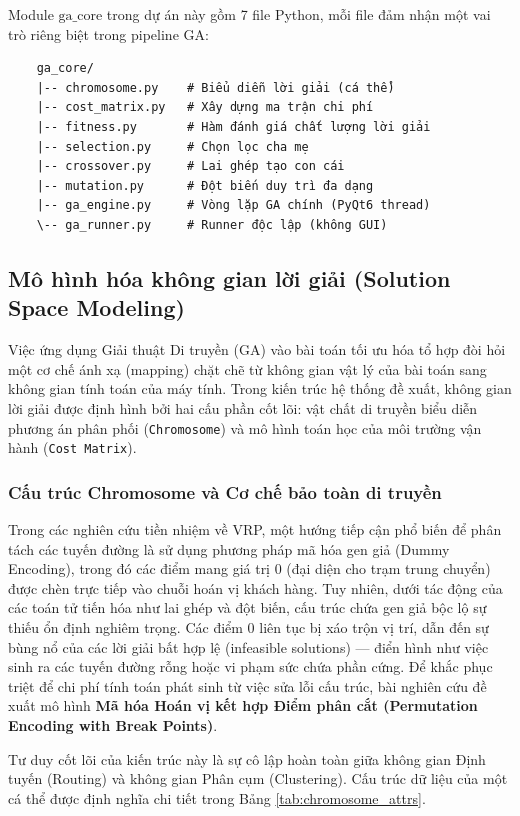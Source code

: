 \documentclass[12pt,a4paper]{article}
\numberwithin{figure}{subsection}
\begin{document}
Module \textbf{$\text{ga\_core}$} trong dự án này gồm 7 file Python, mỗi file đảm nhận một vai trò riêng biệt trong pipeline GA:
    \begin{verbatim}
    ga_core/
    |-- chromosome.py    # Biểu diễn lời giải (cá thể)
    |-- cost_matrix.py   # Xây dựng ma trận chi phí
    |-- fitness.py       # Hàm đánh giá chất lượng lời giải
    |-- selection.py     # Chọn lọc cha mẹ
    |-- crossover.py     # Lai ghép tạo con cái
    |-- mutation.py      # Đột biến duy trì đa dạng
    |-- ga_engine.py     # Vòng lặp GA chính (PyQt6 thread)
    \-- ga_runner.py     # Runner độc lập (không GUI)
\end{verbatim}
\subsection{Mô hình hóa không gian lời giải (Solution Space Modeling)}

Việc ứng dụng Giải thuật Di truyền (GA) vào bài toán tối ưu hóa tổ hợp đòi hỏi một cơ chế ánh xạ (mapping) chặt chẽ từ không gian vật lý của bài toán sang không gian tính toán của máy tính. Trong kiến trúc hệ thống đề xuất, không gian lời giải được định hình bởi hai cấu phần cốt lõi: vật chất di truyền biểu diễn phương án phân phối (\texttt{Chromosome}) và mô hình toán học của môi trường vận hành (\texttt{Cost Matrix}).

\subsubsection{Cấu trúc Chromosome và Cơ chế bảo toàn di truyền}

Trong các nghiên cứu tiền nhiệm về VRP, một hướng tiếp cận phổ biến để phân tách các tuyến đường là sử dụng phương pháp mã hóa gen giả (Dummy Encoding), trong đó các điểm mang giá trị $0$ (đại diện cho trạm trung chuyển) được chèn trực tiếp vào chuỗi hoán vị khách hàng. Tuy nhiên, dưới tác động của các toán tử tiến hóa như lai ghép và đột biến, cấu trúc chứa gen giả bộc lộ sự thiếu ổn định nghiêm trọng. Các điểm $0$ liên tục bị xáo trộn vị trí, dẫn đến sự bùng nổ của các lời giải bất hợp lệ (infeasible solutions) — điển hình như việc sinh ra các tuyến đường rỗng hoặc vi phạm sức chứa phần cứng. Để khắc phục triệt để chi phí tính toán phát sinh từ việc sửa lỗi cấu trúc, bài nghiên cứu đề xuất mô hình \textbf{Mã hóa Hoán vị kết hợp Điểm phân cắt (Permutation Encoding with Break Points)}. 

Tư duy cốt lõi của kiến trúc này là sự cô lập hoàn toàn giữa không gian Định tuyến (Routing) và không gian Phân cụm (Clustering). Cấu trúc dữ liệu của một cá thể được định nghĩa chi tiết trong Bảng \ref{tab:chromosome_attrs}.
\end{document}
